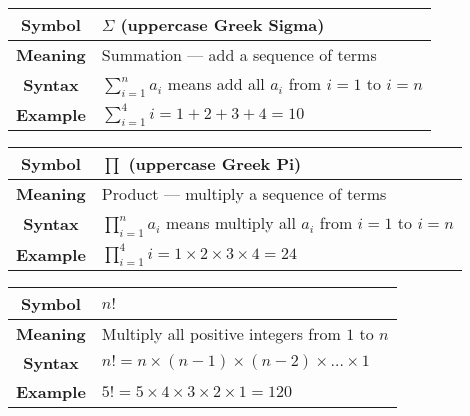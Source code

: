 
\begin{NxLightBox}[title={Summation Notation}]
    \begingroup
    \renewcommand{\arraystretch}{1.8}
    \begin{tabularx}{\linewidth}{|c|X|}
        \hline
        \textbf{Symbol} & \( \Sigma \) (uppercase Greek Sigma) \\
        \hline
        \textbf{Meaning} & Summation — add a sequence of terms \\
        \hline
        \textbf{Syntax} & \( \sum_{i=1}^{n} a_i \) means add all \( a_i \) from \( i = 1 \) to \( i = n \) \\
        \hline
        \textbf{Example} & \( \sum_{i=1}^{4} i = 1 + 2 + 3 + 4 = 10 \) \\
        \hline
    \end{tabularx}
    \endgroup
\end{NxLightBox}

\begin{NxLightBox}[title={Product Notation}]
    \begingroup
    \renewcommand{\arraystretch}{1.8}
    \begin{tabularx}{\linewidth}{|c|X|}
        \hline
        \textbf{Symbol} & \( \prod \) (uppercase Greek Pi) \\
        \hline
        \textbf{Meaning} & Product — multiply a sequence of terms \\
        \hline
        \textbf{Syntax} & \( \prod_{i=1}^{n} a_i \) means multiply all \( a_i \) from \( i = 1 \) to \( i = n \) \\
        \hline
        \textbf{Example} & \( \prod_{i=1}^{4} i = 1 \times 2 \times 3 \times 4 = 24 \) \\
        \hline
    \end{tabularx}
    \endgroup
\end{NxLightBox}

\begin{NxLightBox}[title={Factorial Notation}]
    \begingroup
    \renewcommand{\arraystretch}{1.8}
    \begin{tabularx}{\linewidth}{|c|X|}
        \hline
        \textbf{Symbol} & \( n! \) \\
        \hline
        \textbf{Meaning} & Multiply all positive integers from \( 1 \) to \( n \) \\
        \hline
        \textbf{Syntax} & \( n! = n \times (n-1) \times (n-2) \times \dots \times 1 \) \\
        \hline
        \textbf{Example} & \( 5! = 5 \times 4 \times 3 \times 2 \times 1 = 120 \) \\
        \hline
    \end{tabularx}
    \endgroup
\end{NxLightBox}

